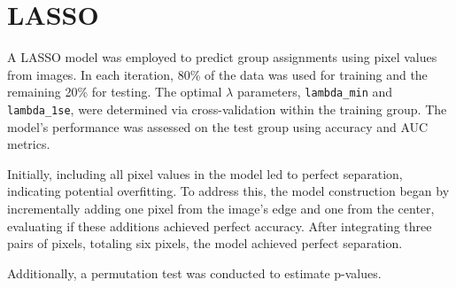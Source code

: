 \documentclass[12pt]{article}
\begin{document}
\section*{LASSO}

A LASSO model was employed to predict group assignments using pixel values from images. In each iteration, 80\% of the data was used for training and the remaining 20\% for testing. The optimal \(\lambda\) parameters, \texttt{lambda\_min} and \texttt{lambda\_1se}, were determined via cross-validation within the training group. The model's performance was assessed on the test group using accuracy and AUC metrics.

Initially, including all pixel values in the model led to perfect separation, indicating potential overfitting. To address this, the model construction began by incrementally adding one pixel from the image's edge and one from the center, evaluating if these additions achieved perfect accuracy. After integrating three pairs of pixels, totaling six pixels, the model achieved perfect separation.

Additionally, a permutation test was conducted to estimate p-values.
\end{document}
